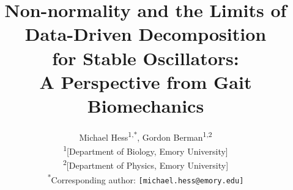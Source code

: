 \documentclass[12pt]{article}
\begin{document}
\title{%
  Non-normality and the Limits of Data-Driven Decomposition \\
  for Stable Oscillators: \\[4pt]
  \large A Perspective from Gait Biomechanics%
}

\author{%
  Michael Hess\textsuperscript{1,*},
  Gordon Berman\textsuperscript{1,2}
  \\[6pt]
  \textsuperscript{1}[Department of Biology, Emory University] \\
  \textsuperscript{2}[Department of Physics, Emory University] \\
  \textsuperscript{*}Corresponding author: \texttt{[michael.hess@emory.edu]}
}

\date{}

\maketitle
\end{document}
